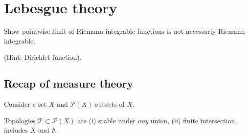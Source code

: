 \documentclass{article}
\newcommand{\powerset}{\mathscr{P}}
\begin{document}
\maketitle



\section{Lebesgue theory}
\begin{ex}
    Show pointwise limit of Riemann-integrable functions is not necessariy Riemann-integrable.
\end{ex}
(Hint: Dirichlet function).

\subsection{Recap of measure theory}
Consider a set $X$ and $\powerset(X)$ subsets of $X$.


\begin{remark}
    Topologies $\mathscr{T} \subset \powerset(X)$ are (i) stable under \textit{any} union, (ii) finite intersection, includes $X$ and $\emptyset$.
\end{remark}
\end{document}
